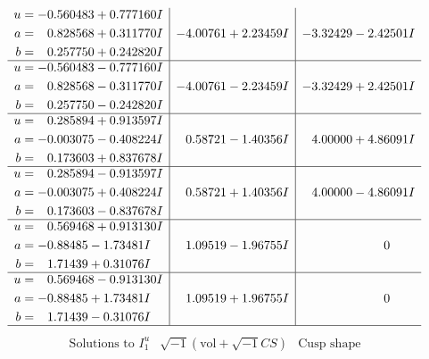 \documentclass[1p]{elsarticle_modified}
\theoremstyle{definition}
\newcommand{\I}{\sqrt{-1}}
\begin{document}
$$\begin{array}{c|c|c}
\begin{aligned}
u &= -0.560483 + 0.777160 I \\
a &= \phantom{-}0.828568 + 0.311770 I \\
b &= \phantom{-}0.257750 + 0.242820 I\end{aligned}
 & -4.00761 + 2.23459 I & -3.32429 - 2.42501 I \\ \hline\begin{aligned}
u &= -0.560483 - 0.777160 I \\
a &= \phantom{-}0.828568 - 0.311770 I \\
b &= \phantom{-}0.257750 - 0.242820 I\end{aligned}
 & -4.00761 - 2.23459 I & -3.32429 + 2.42501 I \\ \hline\begin{aligned}
u &= \phantom{-}0.285894 + 0.913597 I \\
a &= -0.003075 - 0.408224 I \\
b &= \phantom{-}0.173603 + 0.837678 I\end{aligned}
 & \phantom{-}0.58721 - 1.40356 I & \phantom{-}4.00000 + 4.86091 I \\ \hline\begin{aligned}
u &= \phantom{-}0.285894 - 0.913597 I \\
a &= -0.003075 + 0.408224 I \\
b &= \phantom{-}0.173603 - 0.837678 I\end{aligned}
 & \phantom{-}0.58721 + 1.40356 I & \phantom{-}4.00000 - 4.86091 I \\ \hline\begin{aligned}
u &= \phantom{-}0.569468 + 0.913130 I \\
a &= -0.88485 - 1.73481 I \\
b &= \phantom{-}1.71439 + 0.31076 I\end{aligned}
 & \phantom{-}1.09519 - 1.96755 I & \phantom{-0.000000 } 0 \\ \hline\begin{aligned}
u &= \phantom{-}0.569468 - 0.913130 I \\
a &= -0.88485 + 1.73481 I \\
b &= \phantom{-}1.71439 - 0.31076 I\end{aligned}
 & \phantom{-}1.09519 + 1.96755 I & \phantom{-0.000000 } 0\\
 \hline 
 \end{array}$$\newpage$$\begin{array}{c|c|c}  
\text{Solutions to }I^u_{1}& \I (\text{vol} + \sqrt{-1}CS) & \text{Cusp shape}\\

\end{array}$$
\end{document}
